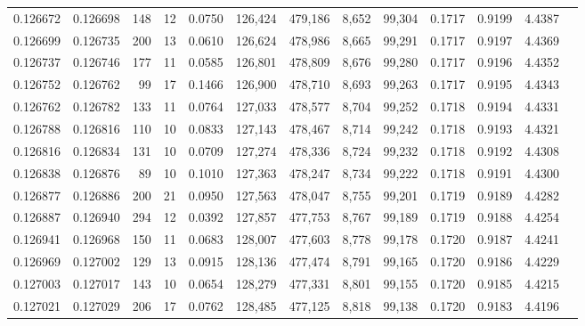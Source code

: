 \begin{tabular}{rrrrrrrrrrrrr}
0.126672 & 0.126698 &   148 &  12 &                                     0.0750 & 126,424 & 479,186 &   8,652 &  99,304 & 0.1717 & 0.9199 & 4.4387 \\
0.126699 & 0.126735 &   200 &  13 &                                     0.0610 & 126,624 & 478,986 &   8,665 &  99,291 & 0.1717 & 0.9197 & 4.4369 \\
0.126737 & 0.126746 &   177 &  11 &                                     0.0585 & 126,801 & 478,809 &   8,676 &  99,280 & 0.1717 & 0.9196 & 4.4352 \\
0.126752 & 0.126762 &    99 &  17 &                                     0.1466 & 126,900 & 478,710 &   8,693 &  99,263 & 0.1717 & 0.9195 & 4.4343 \\
0.126762 & 0.126782 &   133 &  11 &                                     0.0764 & 127,033 & 478,577 &   8,704 &  99,252 & 0.1718 & 0.9194 & 4.4331 \\
0.126788 & 0.126816 &   110 &  10 &                                     0.0833 & 127,143 & 478,467 &   8,714 &  99,242 & 0.1718 & 0.9193 & 4.4321 \\
0.126816 & 0.126834 &   131 &  10 &                                     0.0709 & 127,274 & 478,336 &   8,724 &  99,232 & 0.1718 & 0.9192 & 4.4308 \\
0.126838 & 0.126876 &    89 &  10 &                                     0.1010 & 127,363 & 478,247 &   8,734 &  99,222 & 0.1718 & 0.9191 & 4.4300 \\
0.126877 & 0.126886 &   200 &  21 &                                     0.0950 & 127,563 & 478,047 &   8,755 &  99,201 & 0.1719 & 0.9189 & 4.4282 \\
0.126887 & 0.126940 &   294 &  12 &                                     0.0392 & 127,857 & 477,753 &   8,767 &  99,189 & 0.1719 & 0.9188 & 4.4254 \\
0.126941 & 0.126968 &   150 &  11 &                                     0.0683 & 128,007 & 477,603 &   8,778 &  99,178 & 0.1720 & 0.9187 & 4.4241 \\
0.126969 & 0.127002 &   129 &  13 &                                     0.0915 & 128,136 & 477,474 &   8,791 &  99,165 & 0.1720 & 0.9186 & 4.4229 \\
0.127003 & 0.127017 &   143 &  10 &                                     0.0654 & 128,279 & 477,331 &   8,801 &  99,155 & 0.1720 & 0.9185 & 4.4215 \\
0.127021 & 0.127029 &   206 &  17 &                                     0.0762 & 128,485 & 477,125 &   8,818 &  99,138 & 0.1720 & 0.9183 & 4.4196 \\

\end{tabular}
